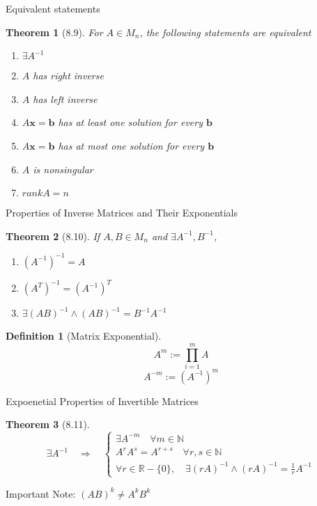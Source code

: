 \documentclass[final]{beamer}
\newtheorem{defn}{Definition}
\newtheorem{thm}{Theorem}
\begin{document}
\begin{frame}[t]{Equivalent statements}
	\begin{thm}
		[8.9] For $A\in M_n$, the following statements are equivalent
		\begin{enumerate}
			\item $\exists A^{-1}$
			\item $A$ has right inverse
			\item $A$ has left inverse
			\item $A\mathbf{x}=\mathbf{b}$ has at least one solution for every $\mathbf{b}$
			\item $A\mathbf{x}=\mathbf{b}$ has at most one solution for every $\mathbf{b}$
			\item $A$ is nonsingular
			\item $rank A = n$
		\end{enumerate}
	\end{thm}
\end{frame}

\begin{frame}[t]{Properties of Inverse Matrices and Their Exponentials}
	\begin{thm}
		[8.10] If $A,B\in M_n$ and $\exists A^{-1}, B^{-1}$,
		\begin{enumerate}
			\item $(A^{-1})^{-1}=A$
			\item $(A^T)^{-1}=(A^{-1})^T$
			\item $\exists(AB)^{-1} \land (AB)^{-1}=B^{-1}A^{-1}$
		\end{enumerate}
	\end{thm}
	\begin{defn}
		[Matrix Exponential]
		\[
			A^m := \prod_{i=1}^m A
		\]\[
			A^{-m} := (A^{-1})^m
		\]
	\end{defn}
\end{frame}

\begin{frame}[t]{Expoenetial Properties of Invertible Matrices}
	\begin{thm}
		[8.11] \[
			\exists A^{-1} \quad\Rightarrow\quad \begin{cases}
				\exists A^{-m} \quad\forall m\in\mathbb{N}\\
				A^rA^s = A^{r+s}\quad\forall r,s\in\mathbb{N}\\
				\forall r\in\mathbb{R}-\{0\}, \quad \exists(rA)^{-1}\land (rA)^{-1}=\frac{1}{r}A^{-1}
			\end{cases}
		\]
	\end{thm}
	Important Note: $(AB)^k\neq A^k B^k$
\end{frame}
\end{document}
